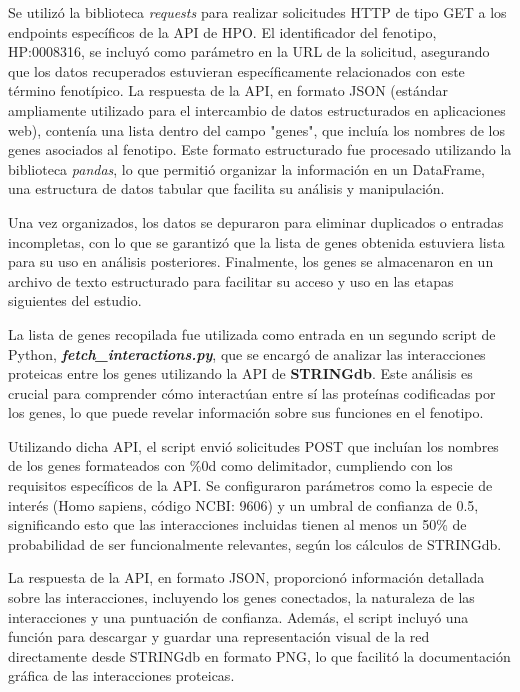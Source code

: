 Se utilizó la biblioteca \textit{requests} para realizar solicitudes HTTP de tipo GET a los endpoints específicos de la API de HPO. El identificador del fenotipo, HP:0008316, se incluyó como parámetro en la URL de la solicitud, asegurando que los datos recuperados estuvieran específicamente relacionados con este término fenotípico. La respuesta de la API, en formato JSON (estándar ampliamente utilizado para el intercambio de datos estructurados en aplicaciones web), contenía una lista dentro del campo "genes", que incluía los nombres de los genes asociados al fenotipo. Este formato estructurado fue procesado utilizando la biblioteca \textit{pandas}, lo que permitió organizar la información en un DataFrame, una estructura de datos tabular que facilita su análisis y manipulación.

Una vez organizados, los datos se depuraron para eliminar duplicados o entradas incompletas, con lo que se garantizó que la lista de genes obtenida estuviera lista para su uso en análisis posteriores. Finalmente, los genes se almacenaron en un archivo de texto estructurado para facilitar su acceso y uso en las etapas siguientes del estudio.

La lista de genes recopilada fue utilizada como entrada en un segundo script de Python, \textbf{\textit{fetch\_interactions.py}}, que se encargó de analizar las interacciones proteicas entre los genes utilizando la API de \textbf{STRINGdb}. Este análisis es crucial para comprender cómo interactúan entre sí las proteínas codificadas por los genes, lo que puede revelar información sobre sus funciones en el fenotipo.

Utilizando dicha API, el script envió solicitudes POST que incluían los nombres de los genes formateados con \%0d como delimitador, cumpliendo con los requisitos específicos de la API. Se configuraron parámetros como la especie de interés (Homo sapiens, código NCBI: 9606) y un umbral de confianza de 0.5, significando esto que las interacciones incluidas tienen al menos un 50\% de probabilidad de ser funcionalmente relevantes, según los cálculos de STRINGdb.

La respuesta de la API, en formato JSON, proporcionó información detallada sobre las interacciones, incluyendo los genes conectados, la naturaleza de las interacciones y una puntuación de confianza. Además, el script incluyó una función para descargar y guardar una representación visual de la red directamente desde STRINGdb en formato PNG, lo que facilitó la documentación gráfica de las interacciones proteicas.

